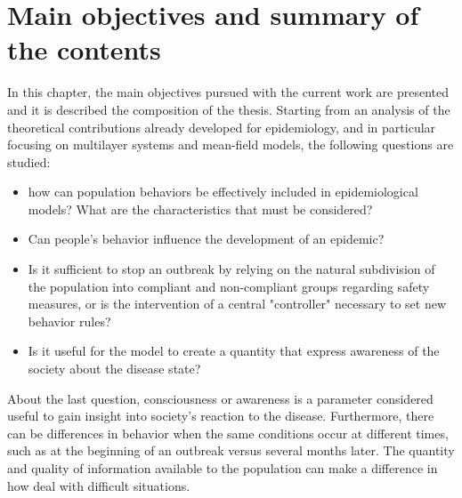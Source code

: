 \chapter{Main objectives and summary of the contents}

In this chapter, the main objectives pursued with the current work are presented and it is described the composition of the thesis. 
Starting from an analysis of the theoretical contributions already developed for epidemiology, and in particular focusing on multilayer systems and mean-field models, the following questions are studied:

\begin{itemize}
	\item how can population behaviors be effectively included in epidemiological models? What are the characteristics that must be considered?
	\item Can people's behavior influence the development of an epidemic?
	\item Is it sufficient to stop an outbreak by relying on the natural subdivision of the population into compliant and non-compliant groups regarding safety measures, or is the intervention of a central "controller" necessary to set new behavior rules?
	\item Is it useful for the model to create a quantity that express awareness of the society about the disease state? 
\end{itemize}
About the last question, consciousness or awareness is a parameter considered useful to gain insight into society's reaction to the disease. Furthermore, there can be differences in behavior when the same conditions occur at different times, such as at the beginning of an outbreak versus several months later. The quantity and quality of information available to the population can make a difference in how deal with difficult situations.

